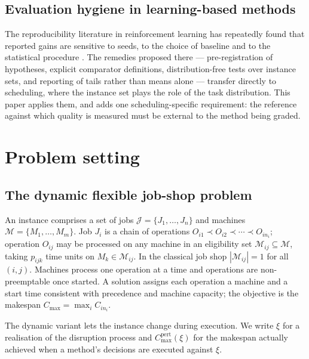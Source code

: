 \documentclass[a4paper,fleqn]{cas-sc}
\newcommand{\Cmax}{C_{\max}}
\begin{document}
\subsection{Evaluation hygiene in learning-based methods}

The reproducibility literature in reinforcement learning has repeatedly found
that reported gains are sensitive to seeds, to the choice of baseline and to the
statistical procedure \citep{henderson2018,agarwal2021}. The remedies proposed
there --- pre-registration of hypotheses, explicit comparator definitions,
distribution-free tests over instance sets, and reporting of tails rather than
means alone \citep{demsar2006,garcia2008,munafo2017,kerr1998} --- transfer
directly to scheduling, where the instance set plays the role of the task
distribution. This paper applies them, and adds one scheduling-specific
requirement: the reference against which quality is measured must be external to
the method being graded.

\section{Problem setting}\label{sec:problem}

\subsection{The dynamic flexible job-shop problem}

An instance comprises a set of jobs $\mathcal{J}=\{J_1,\dots,J_n\}$ and machines
$\mathcal{M}=\{M_1,\dots,M_m\}$. Job $J_i$ is a chain of operations
$O_{i1}\prec O_{i2}\prec\cdots\prec O_{in_i}$; operation $O_{ij}$ may be
processed on any machine in an eligibility set
$\mathcal{M}_{ij}\subseteq\mathcal{M}$, taking $p_{ijk}$ time units on
$M_k\in\mathcal{M}_{ij}$. In the classical job shop $|\mathcal{M}_{ij}|=1$ for
all $(i,j)$. Machines process one operation at a time and operations are
non-preemptable once started. A solution assigns each operation a machine and a
start time consistent with precedence and machine capacity; the objective is the
makespan $\Cmax=\max_{i}C_{i n_i}$.

The dynamic variant lets the instance change during execution. We write
$\xi$ for a realisation of the disruption process and $\Cmax^{\text{pert}}(\xi)$
for the makespan actually achieved when a method's decisions are executed
against $\xi$.
\end{document}
